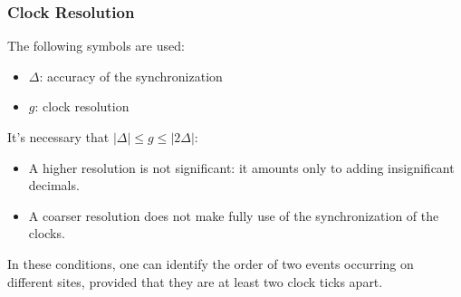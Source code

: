\subsubsection{Clock Resolution}
The following symbols are used:
\begin{itemize}
	\item $\Delta$: accuracy of the synchronization
	\item $g$: clock resolution
\end{itemize}
It's necessary that $| \Delta | \leq g \leq | 2 \Delta |$:
\begin{itemize}
	\item A higher resolution is not significant: it amounts only to adding insignificant decimals.
	\item A coarser resolution does not make fully use of the synchronization of the clocks.
\end{itemize}
In these conditions, one can identify the order of two events occurring on different sites, provided that they are at least two clock ticks apart.



